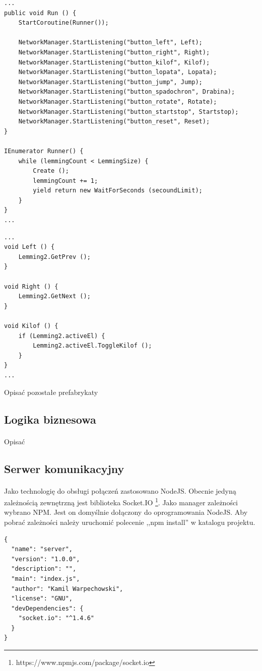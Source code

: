 \begin{lstlisting}[language=CSharp]
...
public void Run () {
	StartCoroutine(Runner());

	NetworkManager.StartListening("button_left", Left);
	NetworkManager.StartListening("button_right", Right);
	NetworkManager.StartListening("button_kilof", Kilof);
	NetworkManager.StartListening("button_lopata", Lopata);
	NetworkManager.StartListening("button_jump", Jump);
	NetworkManager.StartListening("button_spadochron", Drabina);
	NetworkManager.StartListening("button_rotate", Rotate);
	NetworkManager.StartListening("button_startstop", Startstop);
	NetworkManager.StartListening("button_reset", Reset);
}

IEnumerator Runner() {
	while (lemmingCount < LemmingSize) {
		Create ();
		lemmingCount += 1;
		yield return new WaitForSeconds (secoundLimit);
	}
}
...
\end{lstlisting}

\begin{lstlisting}[language=CSharp]
...
void Left () {
	Lemming2.GetPrev ();
}

void Right () {
	Lemming2.GetNext ();
}

void Kilof () {
	if (Lemming2.activeEl) {
		Lemming2.activeEl.ToggleKilof ();
	}
}
...
\end{lstlisting}


{\color{red}Opisać pozostałe prefabrykaty}

\subsection{Logika biznesowa}
\paragraph{}
{\color{red}Opisać}

\subsection{Serwer komunikacyjny}
\paragraph{}
Jako technologię do obsługi połączeń zastosowano NodeJS. Obecnie jedyną zależnością zewnętrzną jest biblioteka Socket.IO \footnote{https://www.npmjs.com/package/socket.io}.
Jako manager zależności wybrano NPM. Jest on domyślnie dołączony do oprogramowania NodeJS. Aby pobrać zależności należy uruchomić polecenie ,,npm install'' w katalogu projektu.

\begin{lstlisting}[language=CSharp]
{
  "name": "server",
  "version": "1.0.0",
  "description": "",
  "main": "index.js",
  "author": "Kamil Warpechowski",
  "license": "GNU",
  "devDependencies": {
    "socket.io": "^1.4.6"
  }
}
\end{lstlisting}
